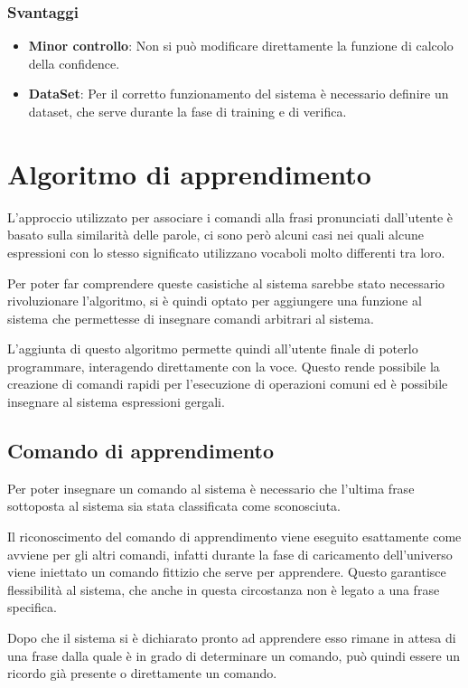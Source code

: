 \documentclass[twoside]{supsistudent}
\begin{document}
\subsection{Svantaggi}
\begin{itemize}
  \item \textbf{Minor controllo}: Non si può modificare direttamente la funzione di calcolo della confidence.
  \item \textbf{DataSet}: Per il corretto funzionamento del sistema è necessario definire un dataset, che serve durante la fase di training e di verifica.
\end{itemize}
\chapter{Algoritmo di apprendimento}
L'approccio utilizzato per associare i comandi alla frasi pronunciati dall'utente è basato sulla similarità delle parole, ci sono però alcuni casi nei quali alcune espressioni con lo stesso significato utilizzano vocaboli molto differenti tra loro.

Per poter far comprendere queste casistiche al sistema sarebbe stato necessario rivoluzionare l'algoritmo, si è quindi optato per aggiungere una funzione al sistema che permettesse di insegnare comandi arbitrari al sistema.

L'aggiunta di questo algoritmo permette quindi all'utente finale di poterlo programmare, interagendo direttamente con la voce. Questo rende possibile la creazione di comandi rapidi per l'esecuzione di operazioni comuni ed è possibile insegnare al sistema espressioni gergali.
\section{Comando di apprendimento}
Per poter insegnare un comando al sistema è necessario che l'ultima frase sottoposta al sistema sia stata classificata come sconosciuta. 

Il riconoscimento del comando di apprendimento viene eseguito esattamente come avviene per gli altri comandi, infatti durante la fase di caricamento dell'universo viene iniettato un comando fittizio che serve per apprendere. Questo garantisce flessibilità al sistema, che anche in questa circostanza non è legato a una frase specifica.

Dopo che il sistema si è dichiarato pronto ad apprendere esso rimane in attesa di una frase dalla quale è in grado di determinare un comando, può quindi essere un ricordo già presente o direttamente un comando.
\end{document}
